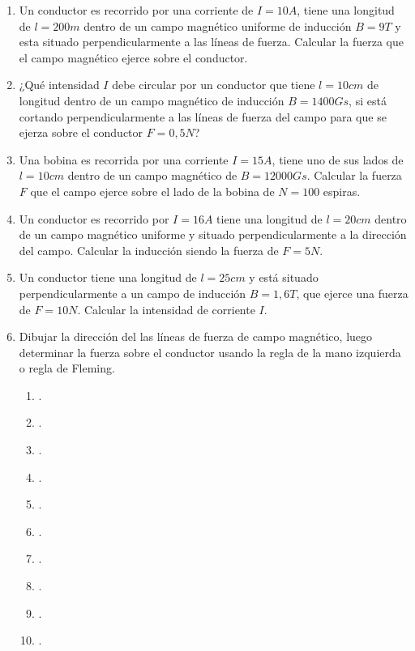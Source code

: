 \documentclass[../main.tex]{subfiles}
\begin{document}
\begin{enumerate}
  \item Un conductor es recorrido por una corriente de $I=10A$, tiene
    una longitud de $l=200m$ dentro de un campo magnético uniforme de
    inducción $B=9T$ y esta situado perpendicularmente a las líneas
    de fuerza. Calcular la fuerza que el campo magnético ejerce sobre
    el conductor.
  \item ¿Qué intensidad $I$ debe circular por un conductor que tiene
    $l=10cm$ de longitud dentro de un campo magnético de inducción
    $B=1400Gs$, si está cortando perpendicularmente a las líneas de
    fuerza del campo para que se ejerza sobre el conductor $F=0,5N$?
  \item Una bobina es recorrida por una corriente $I=15A$, tiene uno
    de sus lados de $l=10cm$ dentro de un campo magnético de
    $B=12000Gs$. Calcular la fuerza $F$ que el campo ejerce sobre el
    lado de la bobina de $N=100$ espiras.
  \item Un conductor es recorrido por $I=16A$ tiene una longitud de
    $l=20cm$ dentro de un campo magnético uniforme y situado
    perpendicularmente a la dirección del campo. Calcular la
    inducción siendo la fuerza de $F=5N$.
  \item Un conductor tiene una longitud de $l=25cm$ y está situado
    perpendicularmente a un campo de inducción $B=1,6T$, que ejerce
    una fuerza de $F=10N$. Calcular la intensidad de corriente $I$.
  \item Dibujar la dirección del las líneas de fuerza de campo
    magnético, luego determinar la fuerza sobre el conductor usando
    la regla de la mano izquierda o regla de Fleming.
    \begin{enumerate}
      \item.
      \item.
      \item.
      \item.
      \item.
      \item.
      \item.
      \item.
      \item.
      \item.
    \end{enumerate}
\end{enumerate}
\end{document}
